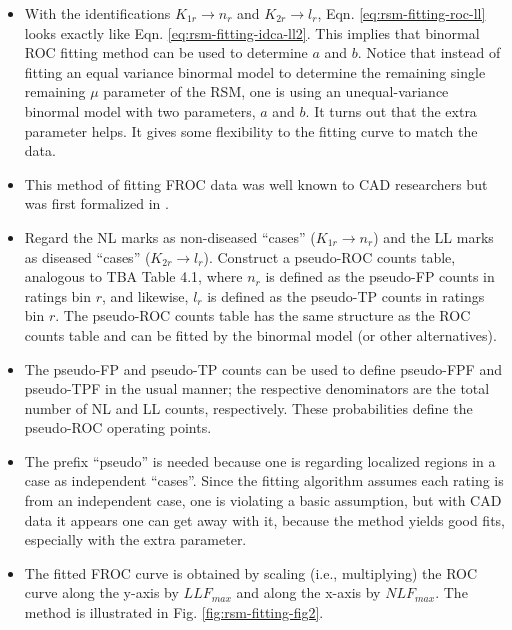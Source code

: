 \documentclass[
]{book}
\begin{document}
\begin{itemize}
\item
  With the identifications \(K_{1r} \rightarrow n_r\) and \(K_{2r} \rightarrow l_r\), Eqn. \eqref{eq:rsm-fitting-roc-ll} looks exactly like Eqn. \eqref{eq:rsm-fitting-idca-ll2}. This implies that binormal ROC fitting method can be used to determine \(a\) and \(b\). Notice that instead of fitting an equal variance binormal model to determine the remaining single remaining \(\mu\) parameter of the RSM, one is using an unequal-variance binormal model with two parameters, \(a\) and \(b\). It turns out that the extra parameter helps. It gives some flexibility to the fitting curve to match the data.
\item
  This method of fitting FROC data was well known to CAD researchers but was first formalized in \citep{edwards2002maximum}.
\item
  Regard the NL marks as non-diseased ``cases'' (\(K_{1r} \rightarrow n_r\)) and the LL marks as diseased ``cases'' (\(K_{2r} \rightarrow l_r\)). Construct a pseudo-ROC counts table, analogous to TBA Table 4.1, where \(n_r\) is defined as the pseudo-FP counts in ratings bin \(r\), and likewise, \(l_r\) is defined as the pseudo-TP counts in ratings bin \(r\). The pseudo-ROC counts table has the same structure as the ROC counts table and can be fitted by the binormal model (or other alternatives).
\item
  The pseudo-FP and pseudo-TP counts can be used to define pseudo-FPF and pseudo-TPF in the usual manner; the respective denominators are the total number of NL and LL counts, respectively. These probabilities define the pseudo-ROC operating points.
\item
  The prefix ``pseudo'' is needed because one is regarding localized regions in a case as independent ``cases''. Since the fitting algorithm assumes each rating is from an independent case, one is violating a basic assumption, but with CAD data it appears one can get away with it, because the method yields good fits, especially with the extra parameter.
\item
  The fitted FROC curve is obtained by scaling (i.e., multiplying) the ROC curve along the y-axis by \(LLF_{max}\) and along the x-axis by \(NLF_{max}\). The method is illustrated in Fig. \ref{fig:rsm-fitting-fig2}.
\end{itemize}
\end{document}

